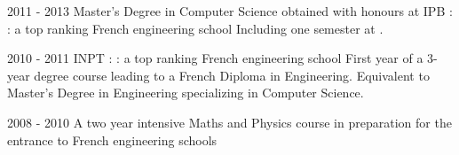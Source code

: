 \cventry
{2011 - 2013}
{Master's Degree in Computer Science}
{obtained with honours at IPB :  : a top ranking French engineering school}
{}
{}
{	
	Including one semester at .
}


\cventry
{2010 - 2011}
{INPT :  : a top ranking French engineering school}
{}
{}
{}
{
	First year of a 3-year degree  course leading to a French Diploma in Engineering. Equivalent to Master's Degree in Engineering
	specializing in Computer Science.
}

\cventry
{2008 - 2010}
{A two year intensive Maths and Physics course in preparation for the entrance
to French engineering schools}
{}
{}
{}
{}


